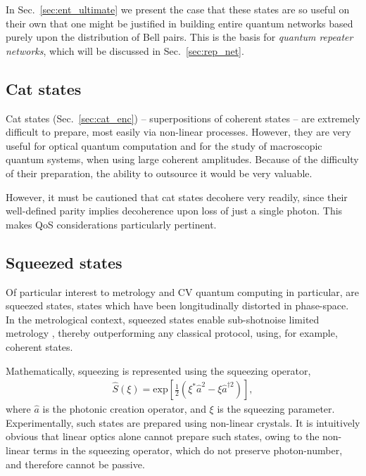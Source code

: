In Sec.~\ref{sec:ent_ultimate} we present the case that these states are so useful on their own that one might be justified in building entire quantum networks based purely upon the distribution of Bell pairs. This is the basis for \textit{quantum repeater networks}, which will be discussed in Sec.~\ref{sec:rep_net}.

%
%

\subsection{Cat states} 

Cat states (Sec.~\ref{sec:cat_enc}) -- superpositions of coherent states -- are extremely difficult to prepare, most easily via non-linear processes. However, they are very useful for optical quantum computation and for the study of macroscopic quantum systems, when using large coherent amplitudes. Because of the difficulty of their preparation, the ability to outsource it would be very valuable.

However, it must be cautioned that cat states decohere very readily, since their well-defined parity implies decoherence upon loss of just a single photon. This makes QoS considerations particularly pertinent.

%
%

\subsection{Squeezed states} \label{sec:squeezed} 

Of particular interest to metrology and CV quantum computing in particular, are squeezed states, states which have been longitudinally distorted in phase-space. In the metrological context, squeezed states enable sub-shotnoise limited metrology \cite{???}, thereby outperforming any classical protocol, using, for example, coherent states.

Mathematically, squeezing is represented using the squeezing operator,
\begin{align}
\hat{S}(\xi) = \mathrm{exp}\left[ \frac{1}{2}(\xi^*\hat{a}^2 - \xi{\hat{a}^{\dag 2}})\right],
\end{align}
where $\hat{a}$ is the photonic creation operator, and $\xi$ is the squeezing parameter. Experimentally, such states are prepared using non-linear crystals. It is intuitively obvious that linear optics alone cannot prepare such states, owing to the non-linear terms in the squeezing operator, which do not preserve photon-number, and therefore cannot be passive.

